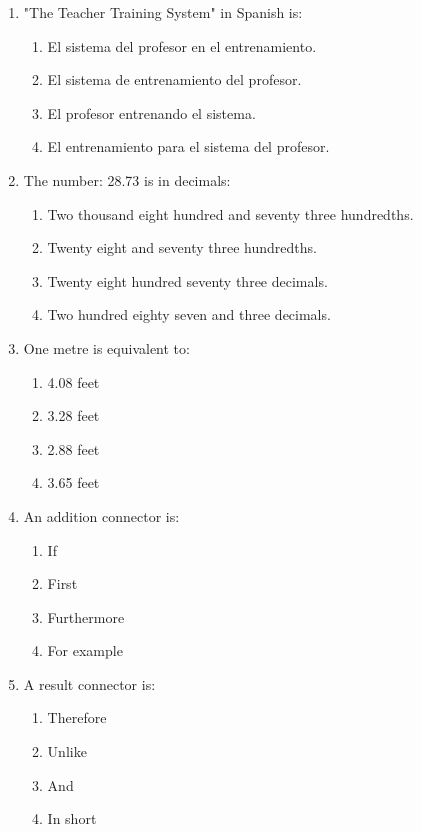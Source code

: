 \documentclass[11pt,a4paper]{article}
\begin{document}
\begin{enumerate}
    \item "The Teacher Training System" in Spanish is:
    \begin{enumerate}[label=\alph*.]
        \item El sistema del profesor en el entrenamiento.
        \item El sistema de entrenamiento del profesor.
        \item El profesor entrenando el sistema.
        \item El entrenamiento para el sistema del profesor.
    \end{enumerate}

    \item The number: 28.73 is in decimals:
    \begin{enumerate}[label=\alph*.]
        \item Two thousand eight hundred and seventy three hundredths.
        \item Twenty eight and seventy three hundredths.
        \item Twenty eight hundred seventy three decimals.
        \item Two hundred eighty seven and three decimals.
    \end{enumerate}

    \item One metre is equivalent to:
    \begin{enumerate}[label=\alph*.]
        \item 4.08 feet
        \item 3.28 feet
        \item 2.88 feet
        \item 3.65 feet
    \end{enumerate}

    \item An addition connector is:
    \begin{enumerate}[label=\alph*.]
        \item If
        \item First
        \item Furthermore
        \item For example
    \end{enumerate}

    \item A result connector is:
    \begin{enumerate}[label=\alph*.]
        \item Therefore
        \item Unlike
        \item And
        \item In short
    \end{enumerate}


\end{enumerate}
\end{document}
